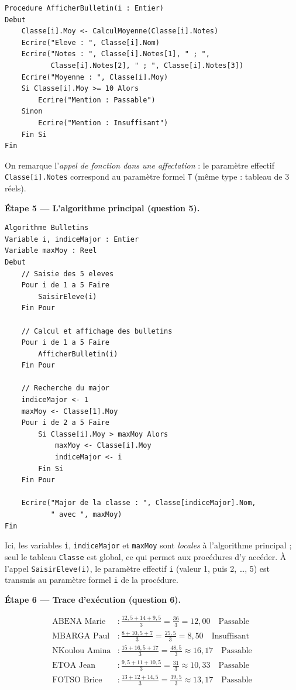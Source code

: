 \documentclass[11pt]{article}
\begin{document}
\begin{exoresolu}
\begin{lstlisting}
Procedure AfficherBulletin(i : Entier)
Debut
    Classe[i].Moy <- CalculMoyenne(Classe[i].Notes)
    Ecrire("Eleve : ", Classe[i].Nom)
    Ecrire("Notes : ", Classe[i].Notes[1], " ; ",
           Classe[i].Notes[2], " ; ", Classe[i].Notes[3])
    Ecrire("Moyenne : ", Classe[i].Moy)
    Si Classe[i].Moy >= 10 Alors
        Ecrire("Mention : Passable")
    Sinon
        Ecrire("Mention : Insuffisant")
    Fin Si
Fin
\end{lstlisting}

On remarque l'\emph{appel de fonction dans une affectation} : le paramètre effectif \texttt{Classe[i].Notes} correspond au paramètre formel \texttt{T} (même type : tableau de 3 réels).

\textbf{Étape 5 — L'algorithme principal (question 5).}

\begin{lstlisting}
Algorithme Bulletins
Variable i, indiceMajor : Entier
Variable maxMoy : Reel
Debut
    // Saisie des 5 eleves
    Pour i de 1 a 5 Faire
        SaisirEleve(i)
    Fin Pour

    // Calcul et affichage des bulletins
    Pour i de 1 a 5 Faire
        AfficherBulletin(i)
    Fin Pour

    // Recherche du major
    indiceMajor <- 1
    maxMoy <- Classe[1].Moy
    Pour i de 2 a 5 Faire
        Si Classe[i].Moy > maxMoy Alors
            maxMoy <- Classe[i].Moy
            indiceMajor <- i
        Fin Si
    Fin Pour

    Ecrire("Major de la classe : ", Classe[indiceMajor].Nom,
           " avec ", maxMoy)
Fin
\end{lstlisting}

Ici, les variables \texttt{i}, \texttt{indiceMajor} et \texttt{maxMoy} sont \emph{locales} à l'algorithme principal ; seul le tableau \texttt{Classe} est global, ce qui permet aux procédures d'y accéder. À l'appel \texttt{SaisirEleve(i)}, le paramètre effectif \texttt{i} (valeur 1, puis 2, \dots, 5) est transmis au paramètre formel \texttt{i} de la procédure.

\textbf{Étape 6 — Trace d'exécution (question 6).}

\begin{align*}
\text{ABENA Marie}   &: \frac{12{,}5 + 14 + 9{,}5}{3} = \frac{36}{3} = 12{,}00 \quad \text{Passable}\\
\text{MBARGA Paul}   &: \frac{8 + 10{,}5 + 7}{3} = \frac{25{,}5}{3} = 8{,}50 \quad \text{Insuffisant}\\
\text{NKoulou Amina} &: \frac{15 + 16{,}5 + 17}{3} = \frac{48{,}5}{3} \approx 16{,}17 \quad \text{Passable}\\
\text{ETOA Jean}     &: \frac{9{,}5 + 11 + 10{,}5}{3} = \frac{31}{3} \approx 10{,}33 \quad \text{Passable}\\
\text{FOTSO Brice}   &: \frac{13 + 12 + 14{,}5}{3} = \frac{39{,}5}{3} \approx 13{,}17 \quad \text{Passable}
\end{align*}


\end{exoresolu}
\end{document}
